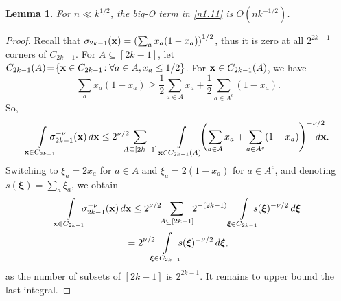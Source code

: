 \documentclass[11pt]{amsart}
\newtheorem{lemma}[theorem]{Lemma}
\theoremstyle{remark}
\numberwithin{equation}{section}
\begin{document}
\begin{lemma}\label{nlem1} For $n\ll k^{1/2}$, the big-O term in \eqref{n1.11} is $O(nk^{-1/2})$.
\end{lemma}
\begin{proof}
Recall that $\sigma_{2k-1}(\bold x)=\left(\sum_a x_a(1-x_a)\right)^{1/2}$, thus it is zero at all $2^{2k-1}$ corners of $C_{2k-1}$. For $A\subseteq [2k-1]$, let $C_{2k-1}(A)\!=\!\{\bold x\in C_{2k-1}\!: \forall a\in A, x_a\le 1/2\}$. For $\bold x\in C_{2k-1}(A)$, we have
\[
\sum_a x_a(1-x_a)\ge \frac{1}{2}\sum_{a\in A} x_a+\frac{1}{2}\sum_{a\in A^c}(1-x_a).
\]
So,
\begin{multline*}
\int\limits_{\bold x\in C_{2k-1}}\!\!\!\!\!\!\sigma^{-\nu}_{2k-1}(\bold x)\,d\bold x\le 2^{\nu/2}\!\!\!\!\!\sum_{A\subseteq [2k-1]}\,\int\limits_{\bold x\in C_{2k-1}(A)}
\!\!\!\left(\sum_{a\in A}x_a +\sum_{a\in A^c}(1-x_a)\right)^{-\nu/2}\!\!\!\!\!\!\! d\bold x.\\
\end{multline*}
Switching to $\xi_a=2x_a$ for $a\in A$ and $\xi_a=2(1-x_a)$ for $a\in A^c$, and denoting $s(\boldsymbol\xi)=\sum_a \xi_a$, we obtain 
\begin{multline}\label{n1.2}
\int\limits_{\bold x\in C_{2k-1}}\!\!\!\!\sigma^{-\nu}_{2k-1}(\bold x)\,d\bold x\le 2^{\nu/2}\!\!\sum_{A\subseteq [2k-1]}
\!\!2^{-(2k-1)}\int\limits_{\boldsymbol\xi\in C_{2k-1}}\!\!\!\!\!s(\boldsymbol\xi)^{-\nu/2}\,d\boldsymbol\xi\\
=2^{\nu/2}\!\!\!\int\limits_{\boldsymbol\xi\in C_{2k-1}}\!\!\!\!s(\boldsymbol\xi)^{-\nu/2}\,d\boldsymbol\xi,
\end{multline}
as the number of subsets of $[2k-1]$ is $2^{2k-1}$. It remains to upper bound the last integral. 


\end{proof}
\end{document}
